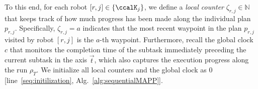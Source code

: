 \documentclass[journal]{IEEEtran}
\newcommand{\auto}[1]{\ccalA_{\text{#1}}}
\newcommand{\autop}{\ccalA_{\phi}}
\newcommand{\domanda}[1]{\subsubsection*{#1}}
\begin{document}
{ To this end, for each robot $[r,j] \in \{\ccalK_j\}$, we define a {\it local counter} $\zeta_{r,j} \in \mathbb{N}$  that  keeps track of how much progress has been made along the individual plan $p_{r,j}$. Specifically, $\zeta_{r,j} = a$ indicates that the most recent waypoint in the plan $p_{r,j}$ visited by  robot $[r,j]$ is the $a$-th waypoint. Furthermore, recall the  global clock $c$ that monitors the completion time of the subtask immediately preceding the current subtask in the axis $\vec{t}$, which also captures the execution progress along the run $\rho_T$. We initialize all local counters and the global clock as 0 [line~\ref{seq:initilization}, Alg.~\ref{alg:sequentialMAPP}].%

}
\end{document}
